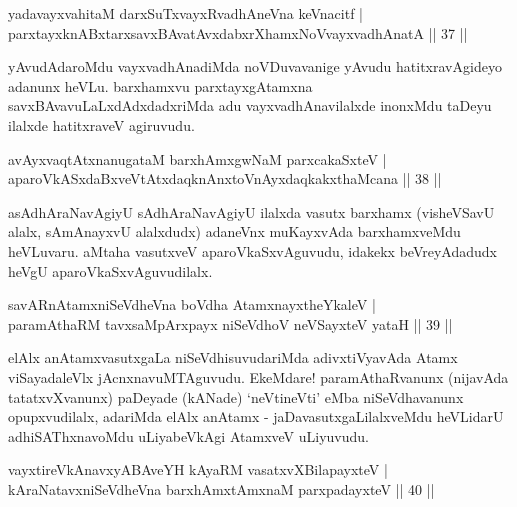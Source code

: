 
\begin{shl}
yadavayxvahitaM darxSuTxvayxRvadhAneVna keVnacitf |\\
parxtayxknABxtarxsavxBAvatAvxdabxrXhamxNoV\s vayxvadhAnatA \hfill || 37 ||
\end{shl}

\begin{artha}
yAvudAdaroMdu vayxvadhAnadiMda noVDuvavanige yAvudu hatitxravAgideyo adanunx heVLu. barxhamxvu parxtayxgAtamxna savxBAvavuLaLxdAdxdadxriMda adu vayxvadhAnavilalxde inonxMdu taDeyu ilalxde hatitxraveV agiruvudu.
\end{artha}%


\begin{shl}
avAyxvaqtAtxnanugataM barxhAmxgwNaM parxcakaSxteV |\\
aparoVkASxdaBxveVtAtxdaqknAnxtoV\s nAyxdaqkakxthaMcana \hfill || 38 ||
\end{shl}

\begin{artha}
asAdhAraNavAgiyU sAdhAraNavAgiyU ilalxda vasutx barxhamx (visheVSavU alalx, sAmAnayxvU alalxdudx) adaneVnx muKayxvAda barxhamxveMdu heVLuvaru. aMtaha vasutxveV aparoVkaSxvAguvudu, idakekx beVreyAdadudx heVgU aparoVkaSxvAguvudilalx.
\end{artha}


\begin{shl}
savARnAtamxniSeVdheVna boVdha AtamxnayxtheYkaleV |\\
paramAthaRM tavxsaMpArxpayx niSeVdhoV neVSayxteV yataH \hfill || 39 ||
\end{shl}

\begin{artha}
elAlx anAtamxvasutxgaLa niSeVdhisuvudariMda adivxtiVyavAda Atamx viSayadaleVlx jAcnxnavuMTAguvudu. EkeMdare! paramAthaRvanunx (nijavAda tatatxvXvanunx) paDeyade (kANade) `neVtineVti' eMba niSeVdhavanunx opupxvudilalx, adariMda elAlx anAtamx - jaDavasutxgaLilalxveMdu heVLidarU adhiSAThxnavoMdu uLiyabeVkAgi AtamxveV uLiyuvudu.
\end{artha}

\begin{shl}
vayxtireVkAnavxyABAveYH kAyaRM vasatxvXBilapayxteV |\\
kAraNatavxniSeVdheVna barxhAmx\s \s tAmxnaM parxpadayxteV \hfill || 40 ||
\end{shl}

